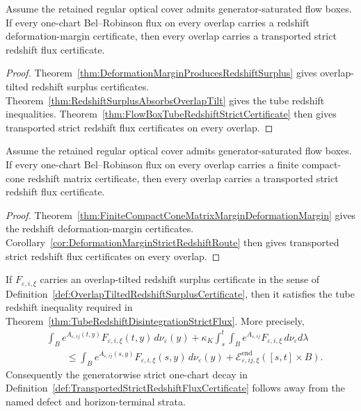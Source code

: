 \begin{corollary}\label{cor:DeformationMarginStrictRedshiftRoute}
Assume the retained regular optical cover admits generator-saturated flow boxes.  If every one-chart Bel--Robinson flux on every overlap carries a redshift deformation-margin certificate, then every overlap carries a transported strict redshift flux certificate.
\end{corollary}

\begin{proof}
Theorem~\ref{thm:DeformationMarginProducesRedshiftSurplus} gives overlap-tilted redshift surplus certificates.  Theorem~\ref{thm:RedshiftSurplusAbsorbsOverlapTilt} gives the tube redshift inequalities.  Theorem~\ref{thm:FlowBoxTubeRedshiftStrictCertificate} then gives transported strict redshift flux certificates on every overlap.
\end{proof}

\begin{corollary}\label{cor:CompactConeMatrixMarginStrictRedshiftRoute}
Assume the retained regular optical cover admits generator-saturated flow boxes.
If every one-chart Bel--Robinson flux on every overlap carries a finite
compact-cone redshift matrix certificate, then every overlap carries a
transported strict redshift flux certificate.
\end{corollary}

\begin{proof}
Theorem~\ref{thm:FiniteCompactConeMatrixMarginDeformationMargin} gives the
redshift deformation-margin certificates.  Corollary~\ref{cor:DeformationMarginStrictRedshiftRoute}
then gives transported strict redshift flux certificates on every overlap.
\end{proof}

\begin{theorem}\label{thm:RedshiftSurplusAbsorbsOverlapTilt}
If $F_{\varepsilon,i,\xi}$ carries an overlap-tilted redshift surplus certificate in the sense of Definition~\ref{def:OverlapTiltedRedshiftSurplusCertificate}, then it satisfies the tube redshift inequality required in Theorem~\ref{thm:TubeRedshiftDisintegrationStrictFlux}.  More precisely,
\[
\begin{split}
    &\int_B e^{A_{\varepsilon,ij}(t,y)}
    F_{\varepsilon,i,\xi}(t,y)\,d\nu_\varepsilon(y)
    +
    \kappa_K
    \int_s^t\int_B
    e^{A_{\varepsilon,ij}}
    F_{\varepsilon,i,\xi}\,d\nu_\varepsilon d\lambda\\
    &\qquad\le
    \int_B e^{A_{\varepsilon,ij}(s,y)}
    F_{\varepsilon,i,\xi}(s,y)\,d\nu_\varepsilon(y)
    +
    \mathcal E^{\mathrm{end}}_{\varepsilon,ij,\xi}([s,t]\times B).
\end{split}
\]
Consequently the generatorwise strict one-chart decay in Definition~\ref{def:TransportedStrictRedshiftFluxCertificate} follows away from the named defect and horizon-terminal strata.
\end{theorem}


